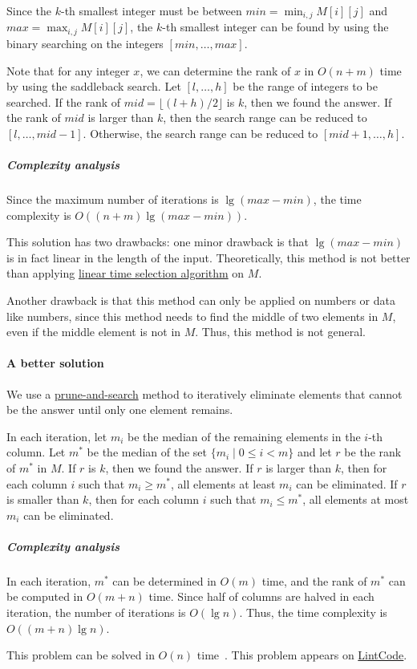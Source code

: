 \begin{Answer}
Since the $k$-th smallest integer must be between $min = \min_{i, j} M[i][j]$ and $max = \max_{i, j} M[i][j]$, the $k$-th smallest integer can be found by using the binary searching on the integers $[min, \dots, max]$.

Note that for any integer $x$, we can determine the rank of $x$ in $O(n + m)$ time by using the saddleback search. 
Let $[l ,\dots, h]$ be the range of integers to be searched.
If the rank of $mid = \lfloor (l + h) / 2 \rfloor$ is $k$, then we found the answer.
If the rank of $mid$ is larger than $k$, then the search range can be reduced to $[l, \dots, mid - 1]$.
Otherwise, the search range can be reduced to $[mid + 1, \dots, h]$.

\subparagraph{Complexity analysis} Since the maximum number of iterations is $\lg (max - min)$, the time complexity is $O((n + m) \lg (max - min))$.

This solution has two drawbacks: one minor drawback is that $\lg (max - min)$ is in fact linear in the length of the input. 
Theoretically, this method is not better than applying \href{https://en.wikipedia.org/wiki/Median_of_medians}{linear time selection algorithm} on $M$.

Another drawback is that this method can only be applied on numbers or data like numbers, since this method needs to find the middle of two elements in $M$, even if the middle element is not in $M$. Thus, this method is not general.

\paragraph{A better solution} We use a \href{https://en.wikipedia.org/wiki/Prune_and_search}{prune-and-search} method to iteratively eliminate elements that cannot be the answer until only one element remains.

In each iteration, let $m_i$ be the median of the remaining elements in the $i$-th column.
Let $m^*$ be the median of the set $\{ m_i \mid 0 \leq i < m \}$ and let $r$ be the rank of $m^*$ in $M$.
If $r$ is $k$, then we found the answer.
If $r$ is larger than $k$, then for each column $i$ such that $m_i \geq m^*$, all elements at least $m_i$ can be eliminated.
If $r$ is smaller than $k$, then for each column $i$ such that $m_i \leq m^*$, all elements at most $m_i$ can be eliminated.

\subparagraph{Complexity analysis} In each iteration, $m^*$ can be determined in $O(m)$ time, and the rank of $m^*$ can be computed in $O(m + n)$ time. Since half of columns are halved in each iteration, the number of iterations is $O(\lg n)$. Thus, the time complexity is $O((m+n) \lg n)$.

\begin{remark}
This problem can be solved in $O(n)$ time~\cite{Frederickson1982,Frederickson1984,Mirzaian1985}. This problem appears on \href{http://www.lintcode.com/en/problem/kth-smallest-number-in-sorted-matrix/}{LintCode}.
\end{remark}
\end{Answer}

